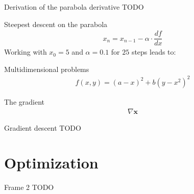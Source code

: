 \documentclass{beamer}
\begin{document}
    \begin{frame}{Derivation of the parabola derivative}
      TODO
    \end{frame}

    \begin{frame}{Steepest descent on the parabola}
      \begin{align}
        x_n = x_{n-1} - \alpha \cdot \dfrac{d f}{dx}
      \end{align}
      Working with $x_0 = 5$ and $\alpha = 0.1$ for $25$ steps leads to: 
      \begin{figure}
        
      \end{figure}
    \end{frame}

    \begin{frame}{Multidimensional problems}
      \begin{align}
        f(x, y) = (a - x)^2 + b(y - x^2)^2
      \end{align}
      \begin{figure}
        
      \end{figure}
    \end{frame}

    \begin{frame}{The gradient}
      \begin{align}
        \nabla \mathbf{x}
      \end{align}

    \end{frame}

    \begin{frame}{Gradient descent}
      TODO
    \end{frame}

    \section{Optimization}
    \begin{frame}{Frame 2}
        TODO
    \end{frame}
\end{document}
